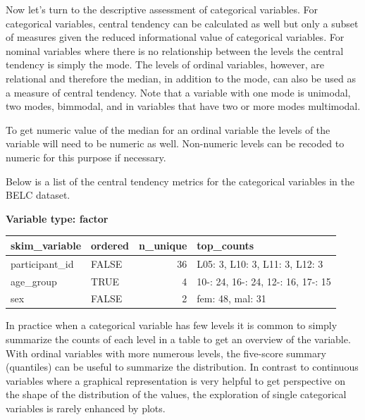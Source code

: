 \documentclass[
  letterpaper,
]{latex/krantz}
\begin{document}
Now let's turn to the descriptive assessment of categorical variables.
For categorical variables, central tendency can be calculated as well
but only a subset of measures given the reduced informational value of
categorical variables. For nominal variables where there is no
relationship between the levels the central tendency is simply the mode.
The levels of ordinal variables, however, are relational and therefore
the median, in addition to the mode, can also be used as a measure of
central tendency. Note that a variable with one mode is unimodal, two
modes, bimmodal, and in variables that have two or more modes
multimodal.

\begin{tcolorbox}[enhanced jigsaw, colbacktitle=quarto-callout-warning-color!10!white, arc=.35mm, toprule=.15mm, breakable, colframe=quarto-callout-warning-color-frame, bottomrule=.15mm, opacitybacktitle=0.6, coltitle=black, titlerule=0mm, colback=white, toptitle=1mm, bottomtitle=1mm, title=\textcolor{quarto-callout-warning-color}{\faExclamationTriangle}\hspace{0.5em}{Tip}, rightrule=.15mm, leftrule=.75mm, opacityback=0, left=2mm]

To get numeric value of the median for an ordinal variable the levels of
the variable will need to be numeric as well. Non-numeric levels can be
recoded to numeric for this purpose if necessary.

\end{tcolorbox}

Below is a list of the central tendency metrics for the categorical
variables in the BELC dataset.

\textbf{Variable type: factor}

\begin{tabular}{l|l|r|l}
\hline
skim\_variable & ordered & n\_unique & top\_counts\\
\hline
participant\_id & FALSE & 36 & L05: 3, L10: 3, L11: 3, L12: 3\\
\hline
age\_group & TRUE & 4 & 10-: 24, 16-: 24, 12-: 16, 17-: 15\\
\hline
sex & FALSE & 2 & fem: 48, mal: 31\\
\hline
\end{tabular}

In practice when a categorical variable has few levels it is common to
simply summarize the counts of each level in a table to get an overview
of the variable. With ordinal variables with more numerous levels, the
five-score summary (quantiles) can be useful to summarize the
distribution. In contrast to continuous variables where a graphical
representation is very helpful to get perspective on the shape of the
distribution of the values, the exploration of single categorical
variables is rarely enhanced by plots.
\end{document}

